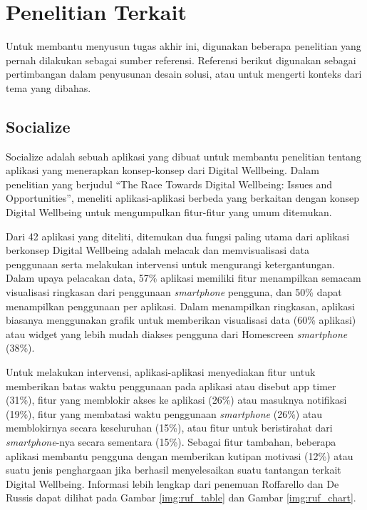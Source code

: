 

\section{Penelitian Terkait}
\label{sec:penelitian_terkait}

Untuk membantu menyusun tugas akhir ini, digunakan beberapa penelitian yang pernah dilakukan sebagai sumber referensi. Referensi berikut digunakan sebagai pertimbangan dalam penyusunan desain solusi, atau untuk mengerti konteks dari tema yang dibahas.

\subsection{Socialize}

Socialize adalah sebuah aplikasi yang dibuat untuk membantu penelitian tentang aplikasi yang menerapkan konsep-konsep dari Digital Wellbeing. Dalam penelitian yang berjudul “The Race Towards Digital Wellbeing: Issues and Opportunities”, \textcite{CHI2019SOCIALIZE} meneliti aplikasi-aplikasi berbeda yang berkaitan dengan konsep Digital Wellbeing untuk mengumpulkan fitur-fitur yang umum ditemukan.

Dari 42 aplikasi yang diteliti, ditemukan dua fungsi paling utama dari aplikasi berkonsep Digital Wellbeing adalah melacak dan memvisualisasi data penggunaan serta melakukan intervensi untuk mengurangi ketergantungan. Dalam upaya pelacakan data, 57\% aplikasi memiliki fitur menampilkan semacam visualisasi ringkasan dari penggunaan \textit{smartphone} pengguna, dan 50\% dapat menampilkan penggunaan per aplikasi. Dalam menampilkan ringkasan, aplikasi biasanya menggunakan grafik untuk memberikan visualisasi data (60\% aplikasi) atau widget yang lebih mudah diakses pengguna dari Homescreen \textit{smartphone} (38\%).

Untuk melakukan intervensi, aplikasi-aplikasi menyediakan fitur untuk memberikan batas waktu penggunaan pada aplikasi atau disebut app timer (31\%), fitur yang memblokir akses ke aplikasi (26\%) atau masuknya notifikasi (19\%), fitur yang membatasi waktu penggunaan \textit{smartphone} (26\%) atau memblokirnya secara keseluruhan (15\%), atau fitur untuk beristirahat dari \textit{smartphone}-nya secara sementara (15\%). Sebagai fitur tambahan, beberapa aplikasi membantu pengguna dengan memberikan kutipan motivasi (12\%) atau suatu jenis penghargaan jika berhasil menyelesaikan suatu tantangan terkait Digital Wellbeing. Informasi lebih lengkap dari penemuan Roffarello dan De Russis dapat dilihat pada Gambar \ref{img:ruf_table} dan Gambar \ref{img:ruf_chart}.

